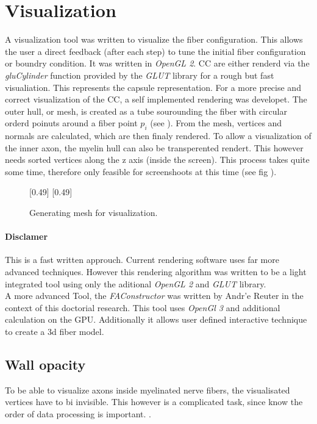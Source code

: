 \section{Visualization}
% 
A visualization tool was written to visualize the fiber configuration. This allows the user a direct feedback (\eg after each step) to tune the initial fiber configuration or boundry condition. It was written in \textit{OpenGL 2}.
% 
\ac{CC} are either renderd via the \textit{gluCylinder} function provided by the \textit{GLUT} library for a rough but fast visualiation. This represents the capsule representation. For a more precise and correct visualization of the \ac{CC}, a self implemented rendering was developet. The outer hull, or mesh, is created as a tube sourounding the fiber with circular orderd poinuts around a fiber point $p_i$ (see \dummy).
% 
From the mesh, vertices and normals are calculated, which are then finaly rendered. To allow a visualization of the inner axon, the myelin hull can also be transperented rendert. This however needs sorted vertices along the z axis (inside the screen). This process takes quite some time, therefore only feasible for screenshoots at this time (see fig \dummy).
% 
\begin{figure}[!t]
    \setlength{\tikzwidth}{0.5\textwidth}
    [0.49\textwidth]{
    }
    [0.49\textwidth]{
    }
	\caption{Generating mesh for visualization.}
	\label{fig:vis_mesh}
\end{figure}
% 
\paragraph{Disclamer}
This is a fast written approuch. Current rendering software uses far more advanced techniques. However this rendering algorithm was written to be a light integrated tool using only the aditional \textit{OpenGL 2} and \textit{GLUT} library.\\
% 
A more advanced Tool, the \textit{FAConstructor} \cite{Reuter2019} was written by Andr'e Reuter in the context of this doctorial research. This tool uses \textit{OpenGl 3} and additional calculation on the GPU. Additionally it allows user defined interactive technique to create a 3d fiber model.
% 
\subsection{Wall opacity}
% 
To be able to visualize axons inside myelinated nerve fibers, the visualisated vertices have to bi invisible.
This however is a complicated task, since know the order of data processing is important.
\dummy.
% 
% 
% 
